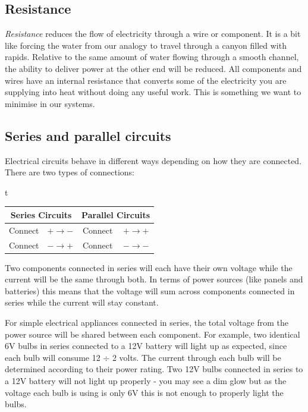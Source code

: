 \documentclass{article}
\theoremstyle{definition}
\theoremstyle{definition}
\theoremstyle{remark}
\begin{document}
  \subsection{Resistance} %
  \label{sub:resistance}

    \textit{Resistance} reduces the flow of electricity through a wire or component. It is a bit like forcing the water from our analogy to travel through a canyon filled with rapids. Relative to the same amount of water flowing through a smooth channel, the ability to deliver power at the other end will be reduced. All components and wires have an internal resistance that converts some of the electricity you are supplying into heat without doing any useful work. This is something we want to minimise in our systems. 
  

  \subsection{Series and parallel circuits} %
  \label{sub:series_and_parallel_circuits}

    Electrical circuits behave in different ways depending on how they are connected. There are two types of connections: 
      
      \begin{table}[!h!]
   t    \centering
        \begin{tabular}{|| c | c | c | c ||}
          \hline
          \multicolumn{2}{|c|}{Series Circuits}  & \multicolumn{2}{|c|}{Parallel Circuits}  \\
          \hline \hline
          Connect & $+ \rightarrow -$ & Connect & $+ \rightarrow +$ \\
          \hline
          Connect & $- \rightarrow +$ & Connect & $- \rightarrow -$ \\
          \hline
        \end{tabular}
        \label{table:two_types_of_connections}
      \end{table}

    Two components connected in series will each have their own voltage while the current will be the same through both. In terms of power sources (like panels and batteries) this means that the voltage will sum across components connected in series while the current will stay constant. 

    For simple electrical appliances connected in series, the total voltage from the power source will be shared between each component. For example, two identical 6V bulbs in series connected to a 12V battery will light up as expected, since each bulb will consume 12 \(\div\) 2 volts. The current through each bulb will be determined according to their power rating. Two 12V bulbs connected in series to a 12V battery will not light up properly - you may see a dim glow but as the voltage each bulb is using is only 6V this is not enough to properly light the bulbs.
\end{document}
